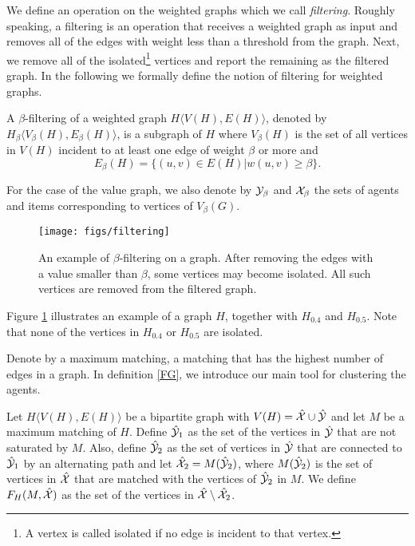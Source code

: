 We define an operation on the weighted graphs which we call \textit{filtering}. Roughly speaking, a filtering is an operation that receives a weighted graph as input and removes all of the edges with weight less than a threshold from the graph. Next, we remove all of the isolated\footnote{A vertex is called isolated if no edge is incident to that vertex.} vertices and report the remaining as the filtered graph. In the following we formally define the notion of filtering for weighted graphs.
\begin{definition}
A $\beta$-filtering of a weighted graph $H\langle V(H),E(H)\rangle$, denoted by $H_{\beta}\langle V_\beta(H),E_\beta(H)\rangle$, is a subgraph of $H$ where $V_\beta(H)$ is the set of all vertices in $V(H)$ incident to at least one edge of weight $\beta$ or more and 
$$E_\beta(H) = \{(u,v) \in E(H)| w(u,v) \geq \beta\}.$$ 
\end{definition}
For the case of the value graph, we also denote by $\mathcal{Y}_\beta$ and $\mathcal{X}_\beta$ the sets of agents and items corresponding to vertices of $V_\beta(G)$.
\begin{figure}[t!]
    \centering
    \texttt{[image: figs/filtering]}
    \caption{An example of $\beta$-filtering on a graph. After removing the edges with a value smaller than $\beta$, some vertices may become isolated. All such vertices are removed from the filtered graph.}
    \label{fig:filtering}
\end{figure}
Figure \ref{fig:filtering} illustrates an example of a graph $H$, together with $H_{0.4}$ and $H_{0.5}$. Note that none of the vertices in $H_{0.4}$ or $H_{0.5}$ are isolated. 
% 

Denote by a maximum matching, a matching that has the highest number of edges in a graph. In definition \ref{FG}, we introduce our main tool for clustering the agents. 
\begin{definition}
\label{FG}
Let $H\langle V(H),E(H)\rangle$ be a bipartite graph with $V(H) = \hat{\mathcal{X}} \cup \hat{\mathcal{Y}}$ and let $M$ be a maximum matching of $H$. Define $\hat{\mathcal{Y}}_1$ as the set of the vertices in $\hat{\mathcal{Y}}$ that are not saturated by $M$. Also, define $\hat{\mathcal{Y}}_2$ as the set of vertices in $\hat{\mathcal{Y}}$ that are connected to $\hat{\mathcal{Y}}_1$ by an alternating path and let $\hat{\mathcal{X}}_2 = M(\hat{\mathcal{Y}}_2)$, where  $M(\hat{\mathcal{Y}}_2)$ is the set of vertices in $\hat{\mathcal{X}}$ that are matched with the vertices of $\hat{\mathcal{Y}}_2$ in $M$. We define $F_{H}(M,\hat{\mathcal{X}})$ as the set of the vertices in $\hat{\mathcal{X}} \setminus \hat{\mathcal{X}}_2$. 
\end{definition}

